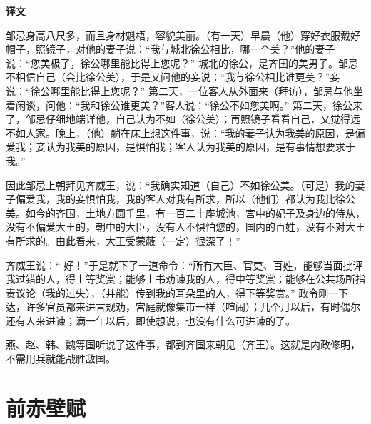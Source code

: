 \documentclass[12pt,UTF-8,openany,a4]{ctexbook}
\begin{document}
\newpage

\begin{Large}
    \noindent\textbf{译文}
\end{Large}


\vspace{1em}

\begin{large}
    \yiwen 
    邹忌身高八尺多，而且身材魁梧，容貌美丽。（有一天）早晨（他）穿好衣服戴好 帽子，照镜子，对他的妻子说：“我与城北徐公相比，哪一个美？”他的妻子说：“您美极了，徐公哪里能比得上您呢？” 城北的徐公，是齐国的美男子。邹忌不相信自己（会比徐公美），于是又问他的妾说：“我与徐公相比谁更美？”妾说：“徐公哪里能比得上您呢？” 第二天，一位客人从外面来（拜访），邹忌与他坐着闲谈，问他：“我和徐公谁更美？”客人说：“徐公不如您美啊。” 第二天，徐公来了，邹忌仔细地端详他，自己认为不如（徐公美）；再照镜子看看自己，又觉得远不如人家。晚上，（他）躺在床上想这件事，说：“我的妻子认为我美的原因，是偏爱我；妾认为我美的原因，是惧怕我；客人认为我美的原因，是有事情想要求于我。”
    
    因此邹忌上朝拜见齐威王，说：“我确实知道（自己）不如徐公美。（可是）我的妻子偏爱我，我的妾惧怕我，我的客人对我有所求，所以（他们）都认为我比徐公美。如今的齐国，土地方圆千里，有一百二十座城池，宫中的妃子及身边的侍从，没有不偏爱大王的，朝中的大臣，没有人不惧怕您的，国内的百姓，没有不对大王有所求的。由此看来，大王受蒙蔽（一定）很深了！”
    
    齐威王说：“ 好！”于是就下了一道命令：“所有大臣、官吏、百姓，能够当面批评我过错的人，得上等奖赏；能够上书劝谏我的人，得中等奖赏；能够在公共场所指责议论（我的过失），（并能）传到我的耳朵里的人，得下等奖赏。” 政令刚一下达，许多官员都来进言规劝，宫庭就像集市一样（喧闹）；几个月以后，有时偶尔还有人来进谏；满一年以后，即使想说，也没有什么可进谏的了。
    
    燕、赵、韩、魏等国听说了这件事，都到齐国来朝见（齐王）。这就是内政修明，不需用兵就能战胜敌国。
    
\end{large}



\chapter{前赤壁赋}
\end{document}
